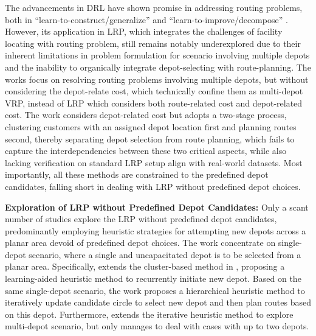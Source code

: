 The advancements in DRL have shown promise in addressing routing problems, both in ``learn-to-construct/generalize'' \cite{kool2018attention, xin2021multi, lin2024cross, zhou2024mvmoe} and ``learn-to-improve/decompose'' \cite{xin2021neurolkh, ma2021learning, ye2024glop}. %
However, its application in LRP, which integrates the challenges of facility locating with routing problem, 
still remains notably underexplored due to their inherent limitations in problem formulation for scenario involving multiple depots and the inability to organically integrate depot-selecting with route-planning. 
The works \cite{arishi2023multi, rabbanian2023analysis, anuar2021multi} focus on resolving routing problems involving multiple depots, but without considering the depot-relate cost,
which technically confine them as multi-depot VRP, instead of LRP which considers both route-related cost and depot-related cost.
The work \cite{wang2023new} considers depot-related cost but adopts a two-stage process, 
clustering customers with an assigned depot location first and planning routes second,
thereby separating depot selection from route planning, 
which fails to capture the interdependencies between these two critical aspects, 
while also lacking verification on standard LRP setup align with real-world datasets.
Most importantly, all these methods are constrained to the predefined depot candidates, 
falling short in dealing with LRP without predefined depot choices.

\textbf{Exploration of LRP without Predefined Depot Candidates:}
Only a scant number of studies explore the LRP without predefined depot candidates, 
predominantly employing heuristic strategies for attempting new depots across a planar area devoid of predefined depot choices. 
The work \cite{schwardt2005solving, schwardt2009combined} concentrate on single-depot scenario, where a single and uncapacitated depot is to be selected from a planar area. 
Specifically, \cite{schwardt2009combined} extends the cluster-based method in \cite{schwardt2005solving}, proposing a learning-aided heuristic method to recurrently initiate new depot. 
Based on the same single-depot scenario, the work \cite{manzour2012hierarchical} proposes a hierarchical heuristic method to iteratively update candidate circle to select new depot and then plan routes based on this depot.
Furthermore, \cite{salhi2009local} extends the iterative heuristic method to explore multi-depot scenario, but only manages to deal with cases with up to two depots. 

